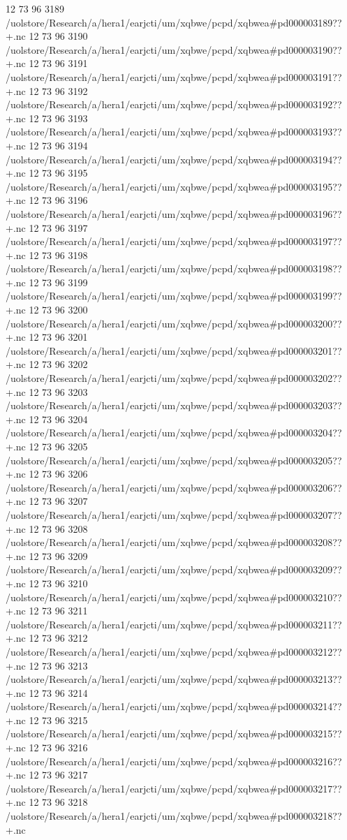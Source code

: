 12 73 96
3189
/uolstore/Research/a/hera1/earjcti/um/xqbwe/pcpd/xqbwea#pd000003189??+.nc
12 73 96
3190
/uolstore/Research/a/hera1/earjcti/um/xqbwe/pcpd/xqbwea#pd000003190??+.nc
12 73 96
3191
/uolstore/Research/a/hera1/earjcti/um/xqbwe/pcpd/xqbwea#pd000003191??+.nc
12 73 96
3192
/uolstore/Research/a/hera1/earjcti/um/xqbwe/pcpd/xqbwea#pd000003192??+.nc
12 73 96
3193
/uolstore/Research/a/hera1/earjcti/um/xqbwe/pcpd/xqbwea#pd000003193??+.nc
12 73 96
3194
/uolstore/Research/a/hera1/earjcti/um/xqbwe/pcpd/xqbwea#pd000003194??+.nc
12 73 96
3195
/uolstore/Research/a/hera1/earjcti/um/xqbwe/pcpd/xqbwea#pd000003195??+.nc
12 73 96
3196
/uolstore/Research/a/hera1/earjcti/um/xqbwe/pcpd/xqbwea#pd000003196??+.nc
12 73 96
3197
/uolstore/Research/a/hera1/earjcti/um/xqbwe/pcpd/xqbwea#pd000003197??+.nc
12 73 96
3198
/uolstore/Research/a/hera1/earjcti/um/xqbwe/pcpd/xqbwea#pd000003198??+.nc
12 73 96
3199
/uolstore/Research/a/hera1/earjcti/um/xqbwe/pcpd/xqbwea#pd000003199??+.nc
12 73 96
3200
/uolstore/Research/a/hera1/earjcti/um/xqbwe/pcpd/xqbwea#pd000003200??+.nc
12 73 96
3201
/uolstore/Research/a/hera1/earjcti/um/xqbwe/pcpd/xqbwea#pd000003201??+.nc
12 73 96
3202
/uolstore/Research/a/hera1/earjcti/um/xqbwe/pcpd/xqbwea#pd000003202??+.nc
12 73 96
3203
/uolstore/Research/a/hera1/earjcti/um/xqbwe/pcpd/xqbwea#pd000003203??+.nc
12 73 96
3204
/uolstore/Research/a/hera1/earjcti/um/xqbwe/pcpd/xqbwea#pd000003204??+.nc
12 73 96
3205
/uolstore/Research/a/hera1/earjcti/um/xqbwe/pcpd/xqbwea#pd000003205??+.nc
12 73 96
3206
/uolstore/Research/a/hera1/earjcti/um/xqbwe/pcpd/xqbwea#pd000003206??+.nc
12 73 96
3207
/uolstore/Research/a/hera1/earjcti/um/xqbwe/pcpd/xqbwea#pd000003207??+.nc
12 73 96
3208
/uolstore/Research/a/hera1/earjcti/um/xqbwe/pcpd/xqbwea#pd000003208??+.nc
12 73 96
3209
/uolstore/Research/a/hera1/earjcti/um/xqbwe/pcpd/xqbwea#pd000003209??+.nc
12 73 96
3210
/uolstore/Research/a/hera1/earjcti/um/xqbwe/pcpd/xqbwea#pd000003210??+.nc
12 73 96
3211
/uolstore/Research/a/hera1/earjcti/um/xqbwe/pcpd/xqbwea#pd000003211??+.nc
12 73 96
3212
/uolstore/Research/a/hera1/earjcti/um/xqbwe/pcpd/xqbwea#pd000003212??+.nc
12 73 96
3213
/uolstore/Research/a/hera1/earjcti/um/xqbwe/pcpd/xqbwea#pd000003213??+.nc
12 73 96
3214
/uolstore/Research/a/hera1/earjcti/um/xqbwe/pcpd/xqbwea#pd000003214??+.nc
12 73 96
3215
/uolstore/Research/a/hera1/earjcti/um/xqbwe/pcpd/xqbwea#pd000003215??+.nc
12 73 96
3216
/uolstore/Research/a/hera1/earjcti/um/xqbwe/pcpd/xqbwea#pd000003216??+.nc
12 73 96
3217
/uolstore/Research/a/hera1/earjcti/um/xqbwe/pcpd/xqbwea#pd000003217??+.nc
12 73 96
3218
/uolstore/Research/a/hera1/earjcti/um/xqbwe/pcpd/xqbwea#pd000003218??+.nc
